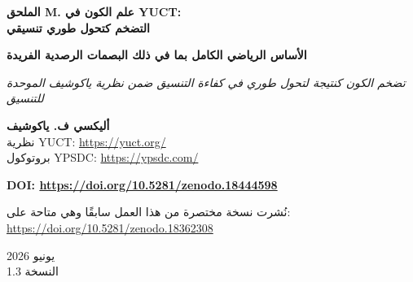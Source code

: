 \documentclass[11pt,a4paper]{article}
\theoremstyle{remark}
\newcommand{\Keff}{K_{\mathrm{eff}}}
\begin{document}
	
	\begin{titlepage} 
		\centering
		\vspace*{2cm}
		{\Huge\textbf{الملحق M. علم الكون في YUCT: \\ التضخم كتحول طوري تنسيقي}\par}
		\vspace{0.5cm}
		{\Large\textbf{الأساس الرياضي الكامل بما في ذلك البصمات الرصدية الفريدة}\par}
		\vspace{0.3cm}
		{\large\textit{تضخم الكون كنتيجة لتحول طوري في كفاءة التنسيق ضمن نظرية ياكوشيف الموحدة للتنسيق}\par}
		\vspace{1.5cm}
		{\large\textbf{أليكسي ف. ياكوشيف} \\}
		نظرية YUCT: \url{https://yuct.org/}\\
		بروتوكول YPSDC: \url{https://ypsdc.com/}\par
		\vspace{2cm}
		\textbf{DOI: \url{https://doi.org/10.5281/zenodo.18444598}}\par
		\vspace{1cm}
		نُشرت نسخة مختصرة من هذا العمل سابقًا وهي متاحة على: \\ \url{https://doi.org/10.5281/zenodo.18362308}\par
		\vspace{1cm}
		يونيو 2026 \\ النسخة 1.3\par
		
		\newpage
		\begin{abstract}
			\noindent
			يقدم هذا الملحق وصفًا رياضياً كاملاً لمرحلة التضخم في تطور الكون كتحول طوري في كفاءة التنسيق $\Keff$ ضمن نظرية ياكوشيف الموحدة للتنسيق (YUCT). يُظهر العمل أنه في الكون المبكر، حيث $\Keff \ll 1$، يكون حقل التنسيق $\Psi_{MN}$ في طور متماثل. عند التبريد، يحدث تحول طوري مصحوباً بارتفاع حاد في $\Keff$ إلى قيم $\Keff \gg 1$، مما يولد تمدداً أسياً (تضخماً) دون الحاجة إلى إدخال حقل عددي أساسي (إنفلاتون). يُشتق الجهد الفعال من لاغرانجيان YUCT ذي الـ 19 بعداً ويرث البنية الفركتالية للقواميس. يلعب أس التدرج الخطأ الكوني $\beta = 0.67$ (الملحق L) دوراً رئيسياً في تحديد معاملات التضخم. تم الحصول على تعابير للدليل الطيفي القياسي $n_s$ والنسبة التنسورية–القياسية $r$، والتي تتفق مع بيانات بلانك وتعطي تنبؤات محددة للتجارب المستقبلية (CMB‑S4، LiteBIRD، Euclid). بعد التضخم، يتحلل مكثف حقل التنسيق إلى جسيمات، مما يملأ الكون بالمادة؛ كفاءة هذه العملية تعتمد أيضاً على $\beta$، رابطاً الاندماج النووي بنفس التدرج الفركتالي. بالإضافة إلى ذلك، نحدد بصمات رصدية فريدة لتضخم YUCT تميزه عن النماذج الأخرى: لاغاوسية محلية ثابتة $f_{\text{NL}}^{\text{local}} \approx 1.12$، نسبة محددة بين $f_{\text{NL}}$ و $r$، أشكال مميزة للمطياف الثنائي، وتذبذبات محتملة في طيف القدرة التنسوري. تم اقتراح بروتوكولات تجريبية لاختبار الطبيعة التنسيقية للتضخم.
		\end{abstract}
		

\end{titlepage}
\end{document}
